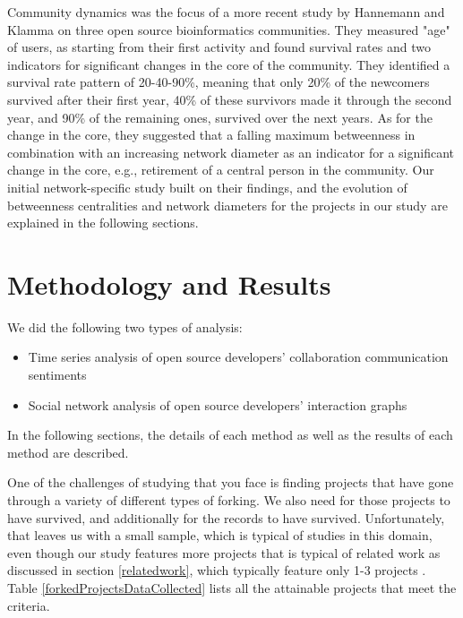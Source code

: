 \documentclass[12pt,letterpaper]{gthesis2}  %
\begin{document}
Community dynamics was the focus of a more recent study by Hannemann and Klamma \cite{Hannemann} on three open source bioinformatics communities. They measured "age" of users, as starting from their first activity and found survival rates and two indicators for significant changes in the core of the community. They identified a survival rate pattern of 20-40-90\%, meaning that only 20\% of the newcomers survived after their first year, 40\% of these survivors made it through the second year, and 90\% of the remaining ones, survived over the next years. As for the change in the core, they suggested that a falling maximum betweenness in combination with an increasing network diameter as an indicator for a significant change in the core, e.g., retirement of a central person in the community. Our initial network-specific study built on their findings, and the evolution of betweenness centralities and network diameters for the projects in our study are explained in the following sections. 

\section{Methodology and Results}
\label{methodology}

We did the following two types of analysis: 
\begin{itemize}
\item Time series analysis of open source developers’ collaboration communication sentiments
\item Social network analysis of open source developers’ interaction graphs
\end{itemize}
In the following sections, the details of each method as well as the results of each method are described.

One of the challenges of studying that you face is finding projects that have gone through a variety of different types of forking. We also need for those projects to have survived, and additionally for the records to have survived. Unfortunately, that leaves us with a small sample, which is typical of studies in this domain, even though our study features more projects that is typical of related work as discussed in section \ref{relatedwork}, which typically feature only 1-3 projects \cite{Baishakhi}\cite{JoseWebKit}\cite{Hannemann}. Table \ref{forkedProjectsDataCollected} lists all the attainable projects that meet the criteria. 
\end{document}
